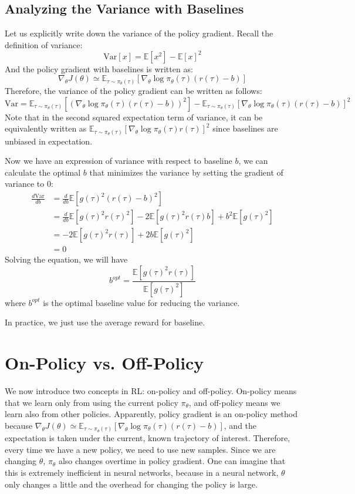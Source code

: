 \subsection{Analyzing the Variance with Baselines}
Let us explicitly write down the variance of the policy gradient. Recall the definition of variance:
$$\mathrm{Var}[x] = \mathbb{E}[x^2]-\mathbb{E}[x]^2$$
And the policy gradient with baselines is written as:
$$\nabla_\theta J(\theta) \simeq \mathbb{E}_{\tau\sim\pi_\theta(\tau)}\left[\nabla_\theta \log\pi_\theta(\tau)\left(r(\tau)-b\right)\right]$$
Therefore, the variance of the policy gradient can be written as follows:
$$\mathrm{Var} = \mathbb{E}_{\tau\sim\pi_\theta(\tau)}\left[\left(\nabla_\theta \log\pi_\theta(\tau)\left(r(\tau)-b\right)\right)^2\right] - \mathbb{E}_{\tau\sim\pi_\theta(\tau)}\left[\nabla_\theta \log\pi_\theta(\tau)\left(r(\tau)-b\right) \right]^2$$
Note that in the second squared expectation term of variance, it can be equivalently written as $\mathbb{E}_{\tau\sim\pi_\theta(\tau)}\left[\nabla_\theta \log\pi_\theta(\tau)r(\tau) \right]^2$ since baselines are unbiased in expectation.

Now we have an expression of variance with respect to baseline $b$, we can calculate the optimal $b$ that minimizes the variance by setting the gradient of variance to 0:
\begin{align*}
    \frac{d\mathrm{Var}}{db} &= \frac{d}{db}\mathbb{E}\left[g(\tau)^2(r(\tau)-b)^2\right]\\ &=\frac{d}{db}\mathbb{E}\left[g(\tau)^2r(\tau)^2\right] - 2\mathbb{E}\left[g(\tau)^2r(\tau)b\right] + b^2\mathbb{E}\left[g(\tau)^2\right]\\
    &=-2\mathbb{E}\left[ g(\tau)^2r(\tau)\right]+2b\mathbb{E}\left[g(\tau)^2\right]\\
    &=0
\end{align*}
Solving the equation, we will have
$$b^{opt} = \frac{\mathbb{E}\left[g(\tau)^2r(\tau)\right]}{\mathbb{E}\left[g(\tau)^2\right]}$$
where $b^{opt}$ is the optimal baseline value for reducing the variance.

In practice, we just use the average reward for baseline. 

\section{On-Policy vs. Off-Policy}
We now introduce two concepts in RL: on-policy and off-policy. On-policy means that we learn only from using the current policy $\pi_\theta$, and off-policy means we learn also from other policies. Apparently, policy gradient is an on-policy method because $\nabla_\theta J(\theta) \simeq \mathbb{E}_{\tau\sim\pi_\theta(\tau)}\left[\nabla_\theta \log\pi_\theta(\tau)\left(r(\tau)-b\right)\right]$, and the expectation is taken under the current, known trajectory of interest. Therefore, every time we have a new policy, we need to use new samples. Since we are changing $\theta$, $\pi_\theta$ also changes overtime in policy gradient. One can imagine that this is extremely inefficient in neural networks, because in a neural network, $\theta$ only changes a little and the overhead for changing the policy is large.

